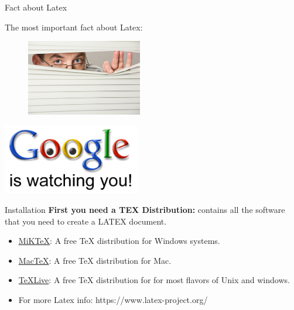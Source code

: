 \documentclass{bredelebeamer}
\begin{document}
   \begin{frame}[<+->]{Fact about Latex}
   	
   	The most important fact about Latex:
   	\begin{multicols}{2}
   	\begin{figure}
   	\includegraphics[width=0.45\textwidth]{images/watch}
   	\end{figure}
   	\columnbreak
   	\includegraphics[width=0.45\textwidth]{images/google}
  \end{multicols}
   \end{frame}
  
  \begin{frame}[<+->]{Installation}
  \textbf{First you need a TEX Distribution:} contains all the software that you need to create a LATEX document.
  \begin{itemize}
  	\item \href{http://miktex.org/}{MiKTeX}: A free TeX distribution for Windows systems.
  	\item \href{http://www.tug.org/mactex/}{MacTeX}: A  free TeX distribution for Mac.
  	\item \href{https://www.tug.org/texlive/}{TeXLive}: A  free TeX distribution for for most flavors of Unix and windows.
  	\item  For more Latex info: https://www.latex-project.org/
  \end{itemize}
  
\end{frame}
\end{document}
